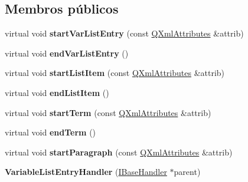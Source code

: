 \subsection*{Membros públicos}
\begin{DoxyCompactItemize}
\item 
\hypertarget{class_variable_list_entry_handler_aeb8206ccc87413e840f5136c28ecf915}{virtual void {\bfseries start\-Var\-List\-Entry} (const \hyperlink{class_q_xml_attributes}{Q\-Xml\-Attributes} \&attrib)}\label{class_variable_list_entry_handler_aeb8206ccc87413e840f5136c28ecf915}

\item 
\hypertarget{class_variable_list_entry_handler_a9ff3753faebadd2aef7a0104e0d97b52}{virtual void {\bfseries end\-Var\-List\-Entry} ()}\label{class_variable_list_entry_handler_a9ff3753faebadd2aef7a0104e0d97b52}

\item 
\hypertarget{class_variable_list_entry_handler_a1d5575fc3ee8b524bd469a184fe15b05}{virtual void {\bfseries start\-List\-Item} (const \hyperlink{class_q_xml_attributes}{Q\-Xml\-Attributes} \&attrib)}\label{class_variable_list_entry_handler_a1d5575fc3ee8b524bd469a184fe15b05}

\item 
\hypertarget{class_variable_list_entry_handler_aa72b7b349a306308193cb0a90710041d}{virtual void {\bfseries end\-List\-Item} ()}\label{class_variable_list_entry_handler_aa72b7b349a306308193cb0a90710041d}

\item 
\hypertarget{class_variable_list_entry_handler_af325f62c0527e696650fad6d1458da16}{virtual void {\bfseries start\-Term} (const \hyperlink{class_q_xml_attributes}{Q\-Xml\-Attributes} \&attrib)}\label{class_variable_list_entry_handler_af325f62c0527e696650fad6d1458da16}

\item 
\hypertarget{class_variable_list_entry_handler_a434ce0b58da682644f5e35e432f47686}{virtual void {\bfseries end\-Term} ()}\label{class_variable_list_entry_handler_a434ce0b58da682644f5e35e432f47686}

\item 
\hypertarget{class_variable_list_entry_handler_abb7f955561480002949ada58092c1964}{virtual void {\bfseries start\-Paragraph} (const \hyperlink{class_q_xml_attributes}{Q\-Xml\-Attributes} \&attrib)}\label{class_variable_list_entry_handler_abb7f955561480002949ada58092c1964}

\item 
\hypertarget{class_variable_list_entry_handler_a361908ed0c2f5f67bfa87d88b8621193}{{\bfseries Variable\-List\-Entry\-Handler} (\hyperlink{class_i_base_handler}{I\-Base\-Handler} $\ast$parent)}\label{class_variable_list_entry_handler_a361908ed0c2f5f67bfa87d88b8621193}


\end{DoxyCompactItemize}
